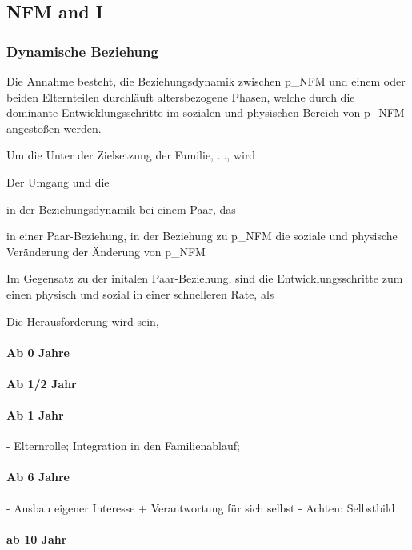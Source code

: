 \begin{itemize}
\section{NFM and I}

\subsubsection{Dynamische Beziehung}
Die Annahme besteht, die Beziehungsdynamik zwischen \gls{p_NFM} und einem oder beiden Elternteilen durchläuft altersbezogene Phasen, welche durch die dominante Entwicklungsschritte im sozialen und physischen Bereich von \gls{p_NFM} angestoßen werden.

Um die 
Unter der Zielsetzung der Familie, ..., wird 

Der Umgang und die 

 in der Beziehungsdynamik bei einem Paar, das 

in einer Paar-Beziehung, in der Beziehung zu \gls{p_NFM} die soziale und physische Veränderung  der Änderung von \gls{p_NFM} 


Im Gegensatz zu der initalen Paar-Beziehung, sind die Entwicklungsschritte zum einen physisch und sozial in einer schnelleren Rate, als

Die Herausforderung wird sein, 


\paragraph{Ab 0 Jahre}
\paragraph{Ab 1/2 Jahr}
\paragraph{Ab 1 Jahr}
- Elternrolle; Integration in den Familienablauf; 
\paragraph{Ab 6 Jahre}
- Ausbau eigener Interesse + Verantwortung für sich selbst
- Achten: Selbstbild
\paragraph{ab 10 Jahr}

\end{itemize}
